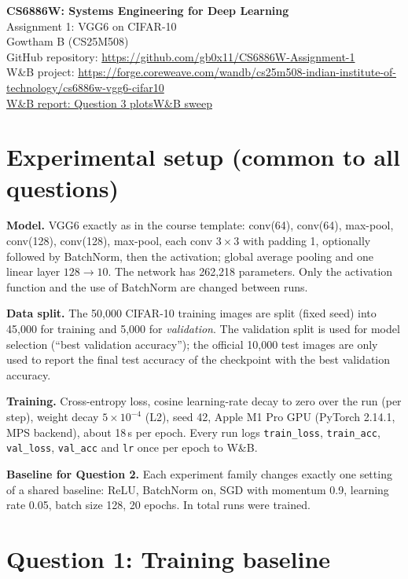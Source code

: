 \documentclass[11pt,a4paper]{article}
\newcommand{\repo}{\url{https://github.com/gb0x11/CS6886W-Assignment-1}}
\newcommand{\wbproject}{\url{https://forge.coreweave.com/wandb/cs25m508-indian-institute-of-technology/cs6886w-vgg6-cifar10}}
\newcommand{\wbreport}{\href{https://forge.coreweave.com/wandb/cs25m508-indian-institute-of-technology/cs6886w-vgg6-cifar10/reports/CS6886W-A1:-VGG6-on-CIFAR-10-(Question-3-plots)--VmlldzoxODE3NjQ4Mw==}{W\&B report: Question 3 plots}}
\begin{document}
\begin{center}
{\LARGE\bfseries CS6886W: Systems Engineering for Deep Learning}\\[4pt]
{\Large Assignment 1: VGG6 on CIFAR-10}\\[10pt]
{\large Gowtham B \quad (CS25M508)}\\[6pt]
GitHub repository: \repo\\
W\&B project: \wbproject\\
\wbreport\quad\textbullet\quad \href{https://forge.coreweave.com/wandb/cs25m508-indian-institute-of-technology/cs6886w-vgg6-cifar10/sweeps/czt61c5k}{W\&B sweep}
\end{center}

\section*{Experimental setup (common to all questions)}

\textbf{Model.} VGG6 exactly as in the course template: conv(64), conv(64), max-pool, conv(128), conv(128), max-pool, each conv $3\times3$ with padding 1, optionally followed by BatchNorm, then the activation; global average pooling and one linear layer $128\to10$. The network has 262{,}218 parameters. Only the activation function and the use of BatchNorm are changed between runs.

\textbf{Data split.} The 50{,}000 CIFAR-10 training images are split (fixed seed) into 45{,}000 for training and 5{,}000 for \emph{validation}. The validation split is used for model selection (``best validation accuracy''); the official 10{,}000 test images are only used to report the final test accuracy of the checkpoint with the best validation accuracy.

\textbf{Training.} Cross-entropy loss, cosine learning-rate decay to zero over the run (per step), weight decay $5\times10^{-4}$ (L2), seed 42, Apple M1 Pro GPU (PyTorch 2.14.1, MPS backend), about 18\,s per epoch. Every run logs \texttt{train\_loss}, \texttt{train\_acc}, \texttt{val\_loss}, \texttt{val\_acc} and \texttt{lr} once per epoch to W\&B.

\textbf{Baseline for Question 2.} Each experiment family changes exactly one setting of a shared baseline: ReLU, BatchNorm on, SGD with momentum 0.9, learning rate 0.05, batch size 128, 20 epochs. In total \NumRuns{} runs were trained.

\section*{Question 1: Training baseline}
\end{document}
